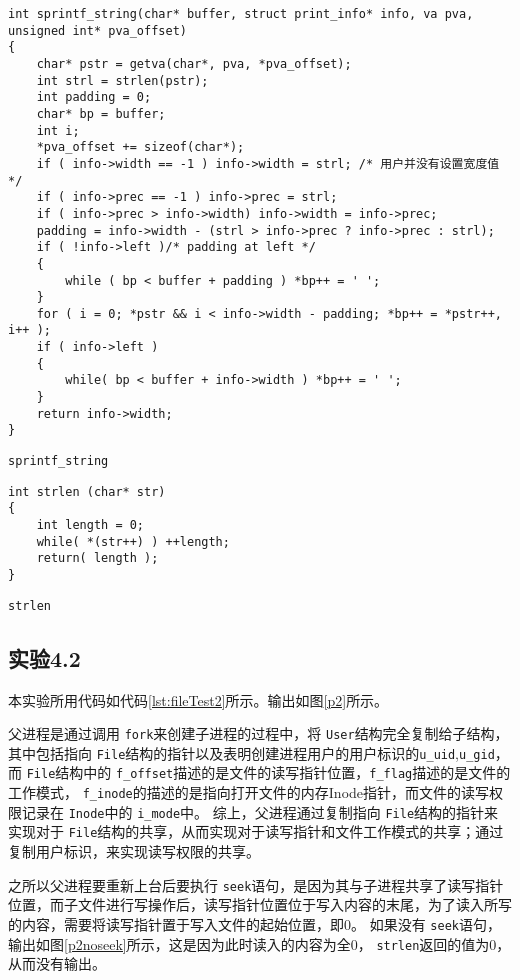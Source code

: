 \begin{listing}[htbp]
    \begin{verbatim}
int sprintf_string(char* buffer, struct print_info* info, va pva, unsigned int* pva_offset)
{
    char* pstr = getva(char*, pva, *pva_offset);
    int strl = strlen(pstr);
    int padding = 0;
    char* bp = buffer;
    int i;
    *pva_offset += sizeof(char*);
    if ( info->width == -1 ) info->width = strl; /* 用户并没有设置宽度值 */
    if ( info->prec == -1 ) info->prec = strl;
    if ( info->prec > info->width) info->width = info->prec;
    padding = info->width - (strl > info->prec ? info->prec : strl);
    if ( !info->left )/* padding at left */
    {
        while ( bp < buffer + padding ) *bp++ = ' ';
    }
    for ( i = 0; *pstr && i < info->width - padding; *bp++ = *pstr++, i++ );
    if ( info->left ) 
    {
        while( bp < buffer + info->width ) *bp++ = ' ';
    }    
    return info->width;
}
    \end{verbatim}
    \caption{\texttt{sprintf\_string}}\label{lst:sprintfstring}
\end{listing}

\begin{listing}[htbp]
    \begin{verbatim}
int strlen (char* str)
{
    int length = 0;
    while( *(str++) ) ++length;
    return( length );
}
    \end{verbatim}
    \caption{\texttt{strlen}}\label{lst:strlen}
\end{listing}

\clearpage

\subsection{实验4.2}

本实验所用代码如代码\ref{lst:fileTest2}所示。输出如图\ref{p2}所示。

父进程是通过调用 \texttt{fork}来创建子进程的过程中，将 \texttt{User}结构完全复制给子结构，其中包括指向 \texttt{File}结构的指针以及表明创建进程用户的用户标识的\texttt{u\_uid},\texttt{u\_gid}，而 \texttt{File}结构中的
\texttt{f\_offset}描述的是文件的读写指针位置，\texttt{f\_flag}描述的是文件的工作模式， \texttt{f\_inode}的描述的是指向打开文件的内存Inode指针，而文件的读写权限记录在 \texttt{Inode}中的 \texttt{i\_mode}中。
综上，父进程通过复制指向 \texttt{File}结构的指针来实现对于 \texttt{File}结构的共享，从而实现对于读写指针和文件工作模式的共享；通过复制用户标识，来实现读写权限的共享。

之所以父进程要重新上台后要执行 \texttt{seek}语句，是因为其与子进程共享了读写指针位置，而子文件进行写操作后，读写指针位置位于写入内容的末尾，为了读入所写的内容，需要将读写指针置于写入文件的起始位置，即0。
如果没有 \texttt{seek}语句，输出如图\ref{p2noseek}所示，这是因为此时读入的内容为全0， \texttt{strlen}返回的值为0，从而没有输出。

